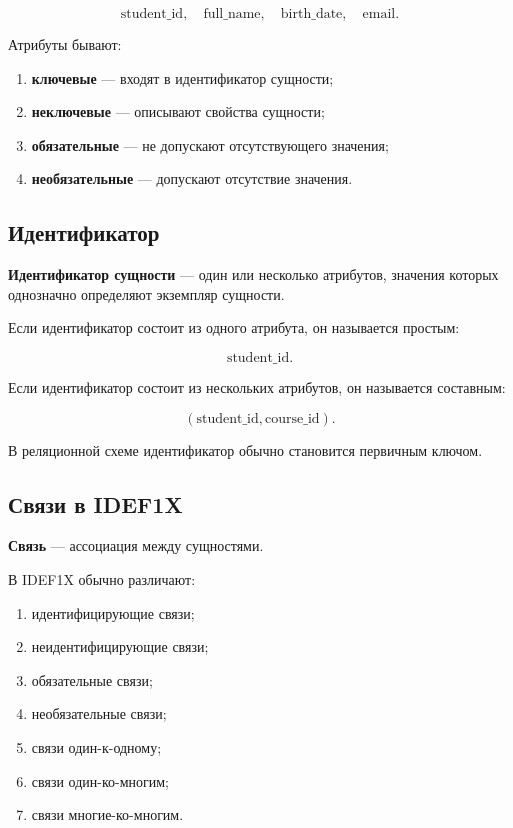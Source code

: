\documentclass[12pt,a4paper]{article}
\theoremstyle{remark}
\begin{document}
\[
    \text{student\_id}, \quad \text{full\_name}, \quad \text{birth\_date}, \quad \text{email}.
\]

Атрибуты бывают:

\begin{enumerate}
    \item \textbf{ключевые} --- входят в идентификатор сущности;
    \item \textbf{неключевые} --- описывают свойства сущности;
    \item \textbf{обязательные} --- не допускают отсутствующего значения;
    \item \textbf{необязательные} --- допускают отсутствие значения.
\end{enumerate}

\subsection{Идентификатор}

\textbf{Идентификатор сущности} --- один или несколько атрибутов, значения которых однозначно определяют экземпляр сущности.

Если идентификатор состоит из одного атрибута, он называется простым:

\[
    \text{student\_id}.
\]

Если идентификатор состоит из нескольких атрибутов, он называется составным:

\[
    (\text{student\_id}, \text{course\_id}).
\]

В реляционной схеме идентификатор обычно становится первичным ключом.

\subsection{Связи в IDEF1X}

\textbf{Связь} --- ассоциация между сущностями.

В IDEF1X обычно различают:

\begin{enumerate}
    \item идентифицирующие связи;
    \item неидентифицирующие связи;
    \item обязательные связи;
    \item необязательные связи;
    \item связи один-к-одному;
    \item связи один-ко-многим;
    \item связи многие-ко-многим.
\end{enumerate}
\end{document}
